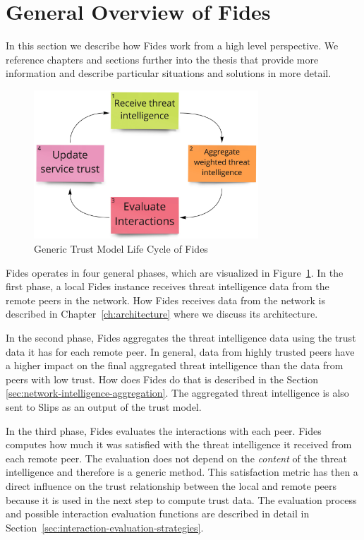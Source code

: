 \section{General Overview of Fides}
\label{sec:general-overview-of-fides}
In this section we describe how Fides work from a high level perspective. We reference chapters and sections further into the thesis that provide more information and describe particular situations and solutions in more detail.

\begin{figure}[ht!]
    \centering
    \includegraphics[width=0.75\textwidth]{assets/fides_lifecycle.jpeg}
    \caption{Generic Trust Model Life Cycle of Fides}
    \label{fig:trust-model-life-cycle}
\end{figure}

Fides operates in four general phases, which are visualized in Figure~\ref{fig:trust-model-life-cycle}.
In the first phase, a local Fides instance receives threat intelligence data from the remote peers in the network. 
How Fides receives data from the network is described in Chapter~\ref{ch:architecture} where we discuss its architecture.

In the second phase, Fides aggregates the threat intelligence data using the trust data it has for each remote peer.
In general, data from highly trusted peers have a higher impact on the final aggregated threat intelligence than the data from peers with low trust.
How does Fides do that is described in the Section~ \ref{sec:network-intelligence-aggregation}.
The aggregated threat intelligence is also sent to Slips as an output of the trust model.

In the third phase, Fides evaluates the interactions with each peer.
Fides computes how much it was satisfied with the threat intelligence it received from each remote peer. The evaluation does not depend on the \textit{content} of the threat intelligence and therefore is a generic method.
This satisfaction metric has then a direct influence on the trust relationship between the local and remote peers because it is used in the next step to compute trust data. 
The evaluation process and possible interaction evaluation functions are described in detail in Section~\ref{sec:interaction-evaluation-strategies}.

